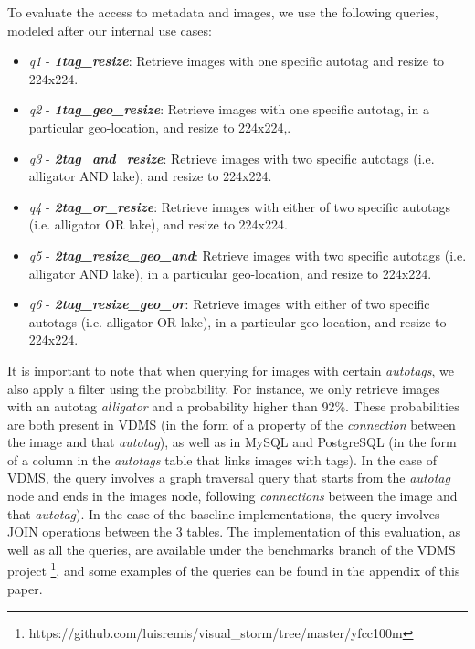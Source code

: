 To evaluate the access to metadata and images,
we use the following queries, modeled after our internal use cases:

\begin{itemize}
\item \textit{q1} - {\bf {\em 1tag\_resize}}: Retrieve images with one specific autotag and resize to 224x224.

\item \textit{q2} - {\bf {\em 1tag\_geo\_resize}}: Retrieve images with one specific autotag, in a particular geo-location, and resize to 224x224,.

\item \textit{q3} - {\bf {\em 2tag\_and\_resize}}: Retrieve images with two specific autotags (i.e. alligator AND lake), and resize to 224x224.

\item \textit{q4} - {\bf {\em 2tag\_or\_resize}}: Retrieve images with either of two specific autotags (i.e. alligator OR lake), and resize to 224x224.

\item \textit{q5} - {\bf {\em 2tag\_resize\_geo\_and}}: Retrieve images with two specific autotags (i.e. alligator AND lake), in a particular geo-location, and resize to 224x224.

\item \textit{q6} - {\bf {\em 2tag\_resize\_geo\_or}}: Retrieve images with either of two specific autotags (i.e. alligator OR lake), in a particular geo-location, and resize to 224x224.

\end{itemize}

It is important to note that when querying for images with certain
\textit{autotags}, we also apply a filter using the probability.
For instance, we only retrieve images with an autotag \textit{alligator}
and a probability higher than 92\%.
These probabilities are both present in VDMS (in the form of a property
of the \textit{connection} between the image and that \textit{autotag}),
as well as in MySQL and PostgreSQL (in the form of a column in the
\textit{autotags} table that links images with tags).
In the case of VDMS, the query involves a graph traversal query that starts
from the \textit{autotag} node and ends in the images node,
following \textit{connections} between the image and that \textit{autotag}).
In the case of the baseline implementations,
the query involves JOIN operations between the 3 tables.
The implementation of this evaluation, as well as all the queries, are available
under the benchmarks branch of the VDMS project
\footnote{https://github.com/luisremis/visual\_storm/tree/master/yfcc100m},
and some examples of the queries can be found in the appendix of this paper.

